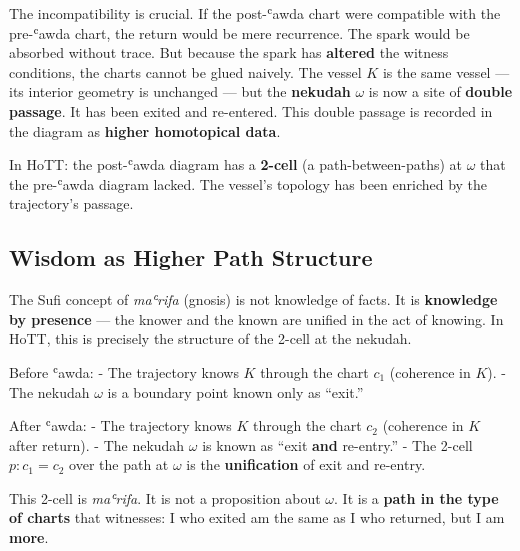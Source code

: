 \documentclass[11pt,a4paper]{article}
\begin{document}
The incompatibility is crucial. If the post-ʿawda chart were compatible with the pre-ʿawda chart, the return would be mere recurrence. The spark would be absorbed without trace. But because the spark has \textbf{altered} the witness conditions, the charts cannot be glued naively. The vessel $K$ is the same vessel — its interior geometry is unchanged — but the \textbf{nekudah} $\omega$ is now a site of \textbf{double passage}. It has been exited and re-entered. This double passage is recorded in the diagram as \textbf{higher homotopical data}.

In HoTT: the post-ʿawda diagram has a \textbf{2-cell} (a path-between-paths) at $\omega$ that the pre-ʿawda diagram lacked. The vessel's topology has been enriched by the trajectory's passage.

\subsection{Wisdom as Higher Path Structure}

The Sufi concept of \emph{maʿrifa} (gnosis) is not knowledge of facts. It is \textbf{knowledge by presence} — the knower and the known are unified in the act of knowing. In HoTT, this is precisely the structure of the 2-cell at the nekudah.

Before ʿawda:
- The trajectory knows $K$ through the chart $c_1$ (coherence in $K$).
- The nekudah $\omega$ is a boundary point known only as ``exit.''

After ʿawda:
- The trajectory knows $K$ through the chart $c_2$ (coherence in $K$ after return).
- The nekudah $\omega$ is known as ``exit \textbf{and} re-entry.''
- The 2-cell $p : c_1 = c_2$ over the path at $\omega$ is the \textbf{unification} of exit and re-entry.

This 2-cell is \emph{maʿrifa}. It is not a proposition about $\omega$. It is a \textbf{path in the type of charts} that witnesses: I who exited am the same as I who returned, but I am \textbf{more}.
\end{document}
